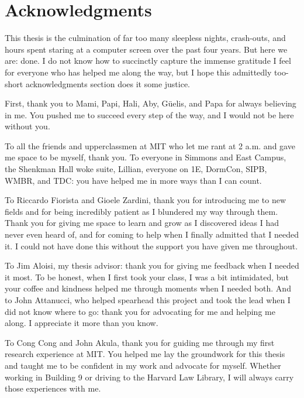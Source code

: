 

\chapter*{Acknowledgments}

This thesis is the culmination of far too many sleepless nights, crash-outs, and hours spent staring at a computer screen over the past four years. But here we are: done. I do not know how to succinctly capture the immense gratitude I feel for everyone who has helped me along the way, but I hope this admittedly too-short acknowledgments section does it some justice.

First, thank you to Mami, Papi, Hali, Aby, G\"uelis, and Papa for always believing in me. You pushed me to succeed every step of the way, and I would not be here without you.

To all the friends and upperclassmen at MIT who let me rant at 2 a.m. and gave me space to be myself, thank you. To everyone in Simmons and East Campus, the Shenkman Hall woke suite, Lillian, everyone on 1E, DormCon, SIPB, WMBR, and TDC: you have helped me in more ways than I can count.

To Riccardo Fiorista and Gioele Zardini, thank you for introducing me to new fields and for being incredibly patient as I blundered my way through them. Thank you for giving me space to learn and grow as I discovered ideas I had never even heard of, and for coming to help when I finally admitted that I needed it. I could not have done this without the support you have given me throughout.

To Jim Aloisi, my thesis advisor: thank you for giving me feedback when I needed it most. To be honest, when I first took your class, I was a bit intimidated, but your coffee and kindness helped me through moments when I needed both. And to John Attanucci, who helped spearhead this project and took the lead when I did not know where to go: thank you for advocating for me and helping me along. I appreciate it more than you know.

To Cong Cong and John Akula, thank you for guiding me through my first research experience at MIT. You helped me lay the groundwork for this thesis and taught me to be confident in my work and advocate for myself. Whether working in Building 9 or driving to the Harvard Law Library, I will always carry those experiences with me.

